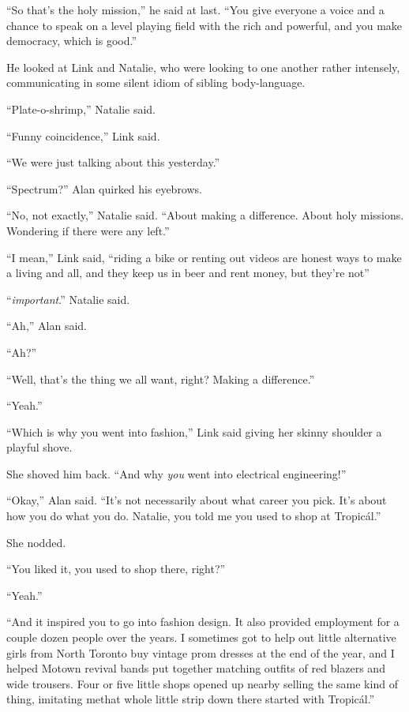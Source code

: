 ``So that's the holy mission,'' he said at last.  ``You give everyone
a voice and a chance to speak on a level playing field with the rich
and powerful, and you make democracy, which is good.''

He looked at Link and Natalie, who were looking to one another rather
intensely, communicating in some silent idiom of sibling
body-language.

``Plate-o-shrimp,'' Natalie said.

``Funny coincidence,'' Link said.

``We were just talking about this yesterday.''

``Spectrum?'' Alan quirked his eyebrows.

``No, not exactly,'' Natalie said.  ``About making a difference. 
About holy missions.  Wondering if there were any left.''

``I mean,'' Link said, ``riding a bike or renting out videos are
honest ways to make a living and all, and they keep us in beer and
rent money, but they're not\dash{}''

``\dash{}\textit{important}.'' Natalie said.

``Ah,'' Alan said.

``Ah?''

``Well, that's the thing we all want, right?  Making a difference.''

``Yeah.''

``Which is why you went into fashion,'' Link said giving her skinny
shoulder a playful shove.

She shoved him back.  ``And why \textit{you} went into electrical
engineering!''

``Okay,'' Alan said.  ``It's not necessarily about what career you
pick.  It's about how you do what you do.  Natalie, you told me you
used to shop at Tropic\'{a}l.''

She nodded.

``You liked it, you used to shop there, right?''

``Yeah.''

``And it inspired you to go into fashion design.  It also provided
employment for a couple dozen people over the years.  I sometimes got
to help out little alternative girls from North Toronto buy vintage
prom dresses at the end of the year, and I helped Motown revival bands
put together matching outfits of red blazers and wide trousers.  Four
or five little shops opened up nearby selling the same kind of thing,
imitating me\dash{}that whole little strip down there started with
Tropic\'{a}l.''

